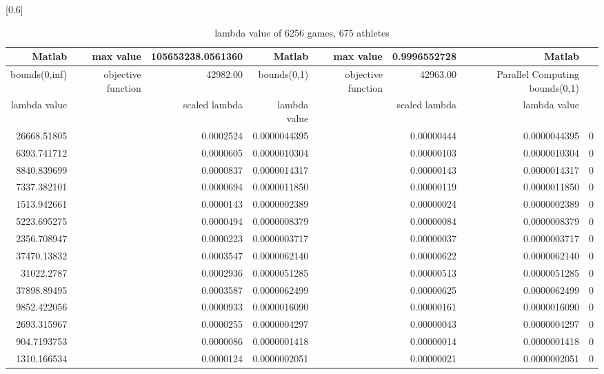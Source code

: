 \documentclass[
journal=jacsat, %
manuscript=article]{achemso}
\begin{document}
\begin{table}[htbp]
  \centering
  \caption{lambda value of 6256 games, 675 athletes}
  \scalebox{0.6}[0.6]{%
    \begin{tabular}{rrrrrrrr}
    \toprule
        Matlab & max value & 105653238.0561360 & Matlab & max value & 0.9996552728 & Matlab \\
    \hline
    bounds(0,inf) & objective function & 42982.00 & bounds(0,1) & objective function & 42963.00 &  Parallel Computing bounds(0,1) \\
    \hline
    lambda value &       & scaled lambda & lambda value  &       & scaled lambda & lambda value  \\
    \bottomrule
    26668.51805 &       & 0.0002524 & 0.0000044395 &       & 0.00000444 & 0.0000044395 & 0 \\
    6393.741712 &       & 0.0000605 & 0.0000010304 &       & 0.00000103 & 0.0000010304 & 0 \\
    8840.839699 &       & 0.0000837 & 0.0000014317 &       & 0.00000143 & 0.0000014317 & 0 \\
    7337.382101 &       & 0.0000694 & 0.0000011850 &       & 0.00000119 & 0.0000011850 & 0 \\
    1513.942661 &       & 0.0000143 & 0.0000002389 &       & 0.00000024 & 0.0000002389 & 0 \\
    5223.695275 &       & 0.0000494 & 0.0000008379 &       & 0.00000084 & 0.0000008379 & 0 \\
    2356.708947 &       & 0.0000223 & 0.0000003717 &       & 0.00000037 & 0.0000003717 & 0 \\
    37470.13832 &       & 0.0003547 & 0.0000062140 &       & 0.00000622 & 0.0000062140 & 0 \\
    31022.2787 &       & 0.0002936 & 0.0000051285 &       & 0.00000513 & 0.0000051285 & 0 \\
    37898.89495 &       & 0.0003587 & 0.0000062499 &       & 0.00000625 & 0.0000062499 & 0 \\
    9852.422056 &       & 0.0000933 & 0.0000016090 &       & 0.00000161 & 0.0000016090 & 0 \\
    2693.315967 &       & 0.0000255 & 0.0000004297 &       & 0.00000043 & 0.0000004297 & 0 \\
    904.7193753 &       & 0.0000086 & 0.0000001418 &       & 0.00000014 & 0.0000001418 & 0 \\
    1310.166534 &       & 0.0000124 & 0.0000002051 &       & 0.00000021 & 0.0000002051 & 0 \\

\end{tabular}}
\end{table}
\end{document}
